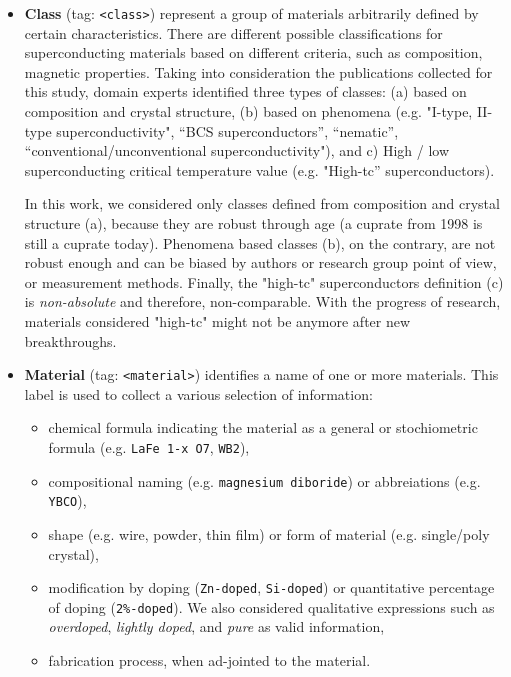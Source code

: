 \documentclass[fleqn,10pt]{wlscirep}
\begin{document}
\begin{itemize}
\item \textbf{Class} (tag: \texttt{<class>}) represent a group of materials arbitrarily defined by certain characteristics.
There are different possible classifications for superconducting materials based on different criteria, such as composition, magnetic properties. Taking into consideration the publications collected for this study, domain experts identified three types of classes: (a) based on composition and crystal structure, (b) based on phenomena (e.g. "I-type, II-type superconductivity", “BCS superconductors”, “nematic”, “conventional/unconventional superconductivity"), and c) High / low superconducting critical temperature value (e.g. "High-tc” superconductors). 

In this work, we considered only classes defined from composition and crystal structure (a), because they are robust through age (a cuprate from 1998 is still a cuprate today). 
Phenomena based classes (b), on the contrary, are not robust enough and can be biased by authors or research group point of view, or measurement methods. 
Finally, the "high-tc" superconductors definition (c) is \textit{non-absolute} and therefore, non-comparable. With the progress of research, materials considered "high-tc" might not be anymore after new breakthroughs.

\item  \textbf{Material} (tag: \texttt{<material>}) identifies a name of one or more materials. 
This label is used to collect a various selection of information: 
\begin{itemize}
    \item chemical formula indicating the material as a general or stochiometric formula (e.g. \texttt{LaFe 1-x O7}, \texttt{WB2}),
    \item compositional naming (e.g. \texttt{magnesium diboride}) or abbreiations (e.g. \texttt{YBCO}), 
    \item shape (e.g. wire, powder, thin film) or form of material (e.g. single/poly crystal), 
    \item modification by doping (\texttt{Zn-doped}, \texttt{Si-doped}) or quantitative percentage of doping (\texttt{2\%-doped}). We also considered qualitative expressions such as \textit{overdoped}, \textit{lightly doped}, and \textit{pure} as valid information, 
    \item fabrication process, when ad-jointed to the material. 
\end{itemize}


\end{itemize}
\end{document}
